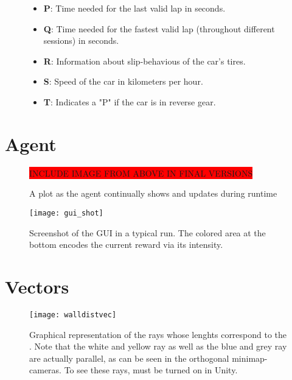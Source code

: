 \begin{figure}[h!t]
\begin{itemize}
		\item \textbf{P}: Time needed for the last valid lap in seconds.
		\item \textbf{Q}: Time needed for the fastest valid lap (throughout different sessions) in seconds.
		\item \textbf{R}: Information about slip-behavious of the car's tires.
		\item \textbf{S}: Speed of the car in kilometers per hour.
		\item \textbf{T}: Indicates a "P" if the car is in reverse gear.
	\end{itemize}
\end{figure}

\clearpage
\section{Agent}


\begin{figure}[h]
	\colorbox{red}{INCLUDE IMAGE FROM ABOVE IN FINAL VERSIONS}
	\centering
	\caption{A plot as the agent continually shows and updates during runtime}
	\label{fig:plot}
\end{figure}

\begin{figure}[h]
	\texttt{[image: gui\_shot]}
	\centering
	\caption[Screenshot of the GUI in a typical run.]{Screenshot of the GUI in a typical run. The colored area at the bottom encodes the current reward via its intensity.}
	\label{fig:gui}
\end{figure}



\clearpage
\section{Vectors}

\begin{figure}[h]
	\texttt{[image: walldistvec]}
	\centering
	\caption[Graphical representation of the rays used for the ]{Graphical representation of the rays whose lenghts correspond to the . Note that the white and yellow ray as well as the blue and grey ray are actually parallel, as can be seen in the orthogonal minimap-cameras. To see these rays,  must be turned on in Unity.}
	\label{fig:walldistvec}
\end{figure}